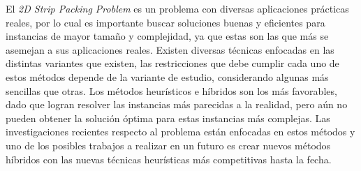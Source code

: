 \documentclass[letter, 10pt]{article}
\begin{document}
El \emph{2D Strip Packing Problem} es un problema con diversas aplicaciones pr\'acticas reales, por lo cual es importante buscar soluciones buenas y eficientes para instancias de mayor tama\~no y complejidad, ya que estas son las que m\'as se asemejan a sus aplicaciones reales. Existen diversas t\'ecnicas enfocadas en las distintas variantes que existen, las restricciones que debe cumplir cada uno de estos m\'etodos depende de la variante de estudio, considerando algunas m\'as sencillas que otras. Los m\'etodos heur\'isticos e h\'ibridos son los m\'as favorables, dado que logran resolver las instancias m\'as parecidas a la realidad, pero a\'un no pueden obtener la soluci\'on \'optima para estas instancias m\'as complejas. Las investigaciones recientes respecto al problema est\'an enfocadas en estos m\'etodos y uno de los posibles trabajos a realizar en un futuro es crear nuevos m\'etodos h\'ibridos con las nuevas t\'ecnicas heur\'isticas m\'as competitivas hasta la fecha. 



\end{document}
